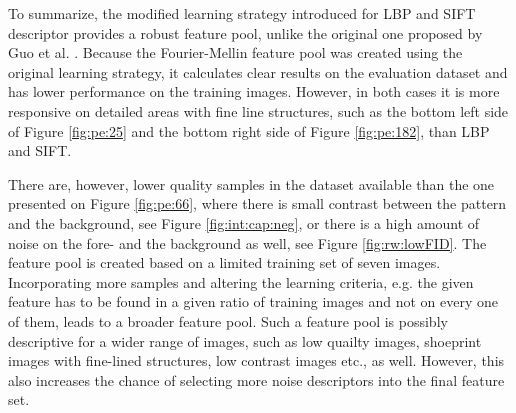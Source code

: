 \documentclass[draft,final]{vutinfth} %
\begin{document}
\par
To summarize, the modified learning strategy introduced for LBP and SIFT descriptor provides a robust feature pool, unlike the original one proposed by Guo et al. \cite{guo2012discriminative}.
Because the Fourier-Mellin feature pool was created using the original learning strategy, it calculates clear results  on the evaluation dataset and has lower performance on the training images.
However, in both cases it is more responsive on detailed areas with fine line structures, such as the bottom left side of Figure \ref{fig:pe:25} and the bottom right side of Figure \ref{fig:pe:182}, than LBP and SIFT.
\par
There are, however, lower quality samples in the dataset available than the one presented on Figure  \ref{fig:pe:66}, where there is small contrast between the pattern and the background, see Figure  \ref{fig:int:cap:neg}, or there is a high amount of noise on the fore- and the background as well, see Figure \ref{fig:rw:lowFID}.
The feature pool is created based on a limited training set of seven images.
Incorporating more samples and altering the learning criteria, e.g. the given feature has to be found in a given ratio of training images and not on every one of them, leads to a broader feature pool.
Such a feature pool is possibly descriptive for a wider range of images, such as low quailty images, shoeprint images with fine-lined structures, low contrast images etc., as well.
However, this also increases the chance of selecting more noise descriptors into the final feature set.
\end{document}
